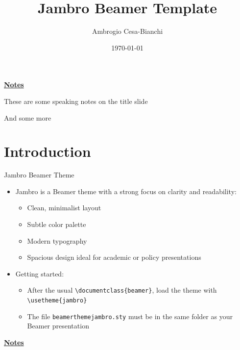 \documentclass[10pt]{beamer}
\title[]{Jambro Beamer Template}
\author[]{Ambrogio Cesa-Bianchi}
\date{\today}
\begin{document}
\begin{frame}[plain]
\end{frame}
\begin{flushleft}
	\underline{\textbf{Notes}}\setlength{\parskip}{.15cm}\notesize\newline\par
	These are some speaking notes on the title slide \par
	And some more 
\end{flushleft}

\section{Introduction}
\begin{frame}{Jambro Beamer Theme}
    \small
    \begin{itemize}
        \item Jambro is a Beamer theme with a strong focus on clarity and readability:
        \begin{itemize}
            \item Clean, minimalist layout \smallskip
            \item Subtle color palette \smallskip
            \item Modern typography \smallskip
            \item Spacious design ideal for academic or policy presentations \bigskip
        \end{itemize}
        \item Getting started:
        \begin{itemize}
            \item After the usual \texttt{\textbackslash documentclass\{beamer\}}, load the theme with \texttt{\textbackslash usetheme\{jambro\}} \smallskip
            \item The file \texttt{beamerthemejambro.sty} must be in the same folder as your Beamer presentation
        \end{itemize}
    \end{itemize}
\end{frame}
\begin{flushleft}
	\underline{\textbf{Notes}}\setlength{\parskip}{.15cm}\notesize\newline\par
\end{flushleft}
\end{document}
